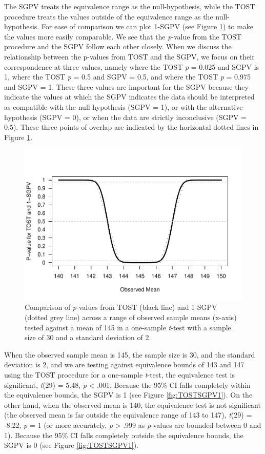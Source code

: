 \documentclass[,man,floatsintext]{apa6}
\begin{document}
The SGPV treats the equivalence range as the null-hypothesis, while the
TOST procedure treats the values outside of the equivalence range as the
null-hypothesis. For ease of comparison we can plot 1-SGPV (see Figure
\ref{fig:TOSTSGPV2}) to make the values more easily comparable. We see
that the \emph{p}-value from the TOST procedure and the SGPV follow each
other closely. When we discuss the relationship between the p-values
from TOST and the SGPV, we focus on their correspondence at three
values, namely where the TOST \emph{p} = 0.025 and SGPV is 1, where the
TOST \emph{p} = 0.5 and SGPV = 0.5, and where the TOST \emph{p} = 0.975
and SGPV = 1. These three values are important for the SGPV because they
indicate the values at which the SGPV indicates the data should be
interpreted as compatible with the null hypothesis (SGPV = 1), or with
the alternative hypothesis (SGPV = 0), or when the data are strictly
inconclusive (SGPV = 0.5). These three points of overlap are indicated
by the horizontal dotted lines in Figure \ref{fig:TOSTSGPV2}.

\begin{figure}
\centering
\includegraphics{manuscript.R1_files/figure-latex/TOSTSGPV2-1.pdf}
\caption{\label{fig:TOSTSGPV2}Comparison of \emph{p}-values from TOST (black
line) and 1-SGPV (dotted grey line) across a range of observed sample
means (x-axis) tested against a mean of 145 in a one-sample
\emph{t}-test with a sample size of 30 and a standard deviation of 2.}
\end{figure}

When the observed sample mean is 145, the sample size is 30, and the
standard deviation is 2, and we are testing against equivalence bounds
of 143 and 147 using the TOST procedure for a one-sample \emph{t}-test,
the equivalence test is significant, \emph{t}(29) = 5.48, \emph{p}
\textless{} .001. Because the 95\% CI falls completely within the
equivalence bounds, the SGPV is 1 (see Figure \ref{fig:TOSTSGPV1}). On
the other hand, when the observed mean is 140, the equivalence test is
not significant (the observed mean is far outside the equivalence range
of 143 to 147), \emph{t}(29) = -8.22, \emph{p} = 1 (or more accurately,
\emph{p} \textgreater{} .999 as \emph{p}-values are bounded between 0
and 1). Because the 95\% CI falls completely outside the equivalence
bounds, the SGPV is 0 (see Figure \ref{fig:TOSTSGPV1}).
\end{document}
